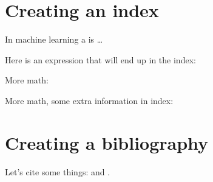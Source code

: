\section{Creating an index}











In machine learning a  is \ldots 

Here is an expression that will end up in the index: 

More math: 

More math, some extra information in index:  





\section{Creating a bibliography} 

Let's cite some things:  \cite{latexcompanion,knuthwebsite} and \cite{einstein}. 